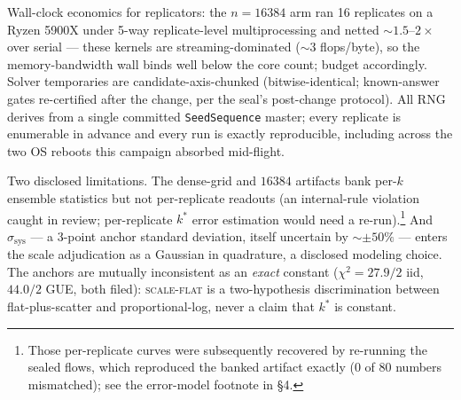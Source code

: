 \documentclass[11pt]{article}
\newcommand{\kstar}{k^{*}}
\newcommand{\ssys}{\sigma_{\mathrm{sys}}}
\newcommand{\verdict}[1]{\textsc{#1}}
\begin{document}
Wall-clock economics for replicators: the $n=16384$ arm ran 16 replicates on a Ryzen 5900X under
5-way replicate-level multiprocessing and netted ${\sim}1.5$--$2\times$ over serial --- these
kernels are streaming-dominated (${\sim}3$ flops/byte), so the memory-bandwidth wall binds well
below the core count; budget accordingly. Solver temporaries are candidate-axis-chunked
(bitwise-identical; known-answer gates re-certified after the change, per the seal's post-change
protocol). All RNG derives from a single committed \texttt{SeedSequence} master; every replicate
is enumerable in advance and every run is exactly reproducible, including across the two OS
reboots this campaign absorbed mid-flight.

Two disclosed limitations. The dense-grid and $16384$ artifacts bank per-$k$ ensemble statistics
but not per-replicate readouts (an internal-rule violation caught in review; per-replicate
$\kstar$ error estimation would need a re-run).\footnote{Those per-replicate curves were
subsequently recovered by re-running the sealed flows, which reproduced the banked artifact
exactly (0 of 80 numbers mismatched); see the error-model footnote in \S4.} And $\ssys$ --- a
3-point anchor standard deviation, itself uncertain by ${\sim}\pm50\%$ --- enters the scale
adjudication as a Gaussian in quadrature, a disclosed modeling choice. The anchors are mutually
inconsistent as an \emph{exact} constant ($\chi^2=27.9/2$ iid, $44.0/2$ GUE, both filed):
\verdict{scale-flat} is a two-hypothesis discrimination between flat-plus-scatter and
proportional-log, never a claim that $\kstar$ is constant.
\end{document}
